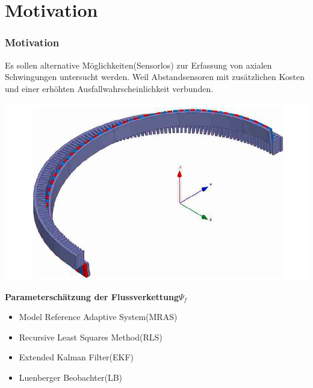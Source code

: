 \documentclass[serif,11pt, xcolor=table]{beamer}
\begin{document}
\section{Motivation}
\begin{frame}
	\frametitle{Motivation}
\tiny{Es sollen alternative Möglichkeiten(Sensorlos) zur Erfassung von axialen Schwingungen untersucht werden. Weil Abstandsensoren mit zusätzlichen Kosten und einer erhöhten Ausfallwahrscheinlichkeit verbunden.}\\
	\begin{floatingfigure}[r]{0.38\linewidth}
		\includegraphics[scale=0.22]{Abbildungen/Flussverkettung.JPG}
		
	\end{floatingfigure}
	 \vskip 0.2cm
	\textbf{Parameterschätzung der Flussverkettung$\Psi_{f}$}
	\vskip 0.2cm
	\begin{itemize}\itemsep=3ex
		\item Model Reference Adaptive System(MRAS)
   \vskip 0.4cm
	
		\item Recursive Least Squares Method(RLS)
	  \vskip 0.4cm

		\item Extended Kalman Filter(EKF)
	 \vskip 0.4cm

		\item Luenberger Beobachter(LB)
	\end{itemize}
\end{frame}
\end{document}
